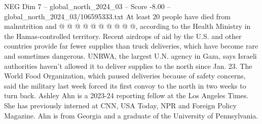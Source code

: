 \begin{textsample}{NEG Dim 7 – global\_north\_2024\_03 – Score -8.00 – global\_north\_2024\_03/106595333.txt}
At least 20 people have died from malnutrition and @ @ @ @ @ @ @ @ @ @, according to the Health Ministry in the Hamas-controlled territory.
Recent airdrops of aid by the U.S. and other countries provide far fewer supplies than truck deliveries, which have become rare and sometimes dangerous.
UNRWA, the largest U.N. agency in Gaza, says Israeli authorities haven't allowed it to deliver supplies to the north since Jan. 23.
The World Food Organization, which paused deliveries because of safety concerns, said the military last week forced its first convoy to the north in two weeks to turn back.
Ashley Ahn is a 2023-24 reporting fellow at the Los Angeles Times.
She has previously interned at CNN, USA Today, NPR and Foreign Policy Magazine.
Ahn is from Georgia and a graduate of the University of Pennsylvania.

\end{textsample}
